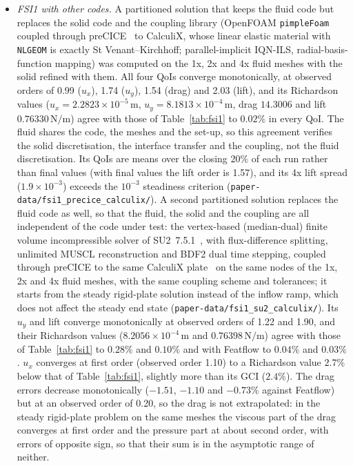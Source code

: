 \begin{itemize}
	\item \emph{FSI1 with other codes.} A partitioned solution that keeps the fluid code but replaces the solid code and the coupling library (OpenFOAM \texttt{pimpleFoam} coupled through preCICE~\citep{Chourdakis2022} to CalculiX, whose linear elastic material with \texttt{NLGEOM} is exactly St Venant--Kirchhoff; parallel-implicit IQN-ILS, radial-basis-function mapping) was computed on the 1x, 2x and 4x fluid meshes with the solid refined with them. All four QoIs converge monotonically, at observed orders of 0.99 ($u_x$), 1.74 ($u_y$), 1.54 (drag) and 2.03 (lift), and its Richardson values ($u_x = 2.2823\times10^{-5}\,\mathrm{m}$, $u_y = 8.1813\times10^{-4}\,\mathrm{m}$, drag $14.3006$ and lift $0.76330\,\mathrm{N/m}$) agree with those of Table~\ref{tab:fsi1} to $0.02\%$ in every QoI. The fluid shares the code, the meshes and the set-up, so this agreement verifies the solid discretisation, the interface transfer and the coupling, not the fluid discretisation. Its QoIs are means over the closing $20\%$ of each run rather than final values (with final values the lift order is 1.57), and its 4x lift spread ($1.9\times10^{-3}$) exceeds the $10^{-3}$ steadiness criterion (\texttt{paper-data/fsi1\_precice\_calculix/}).
	A second partitioned solution replaces the fluid code as well, so that the fluid, the solid and the coupling are all independent of the code under test: the vertex-based (median-dual) finite volume incompressible solver of SU2~7.5.1~\citep{Economon2016,Economon2020}, with flux-difference splitting, unlimited MUSCL reconstruction and BDF2 dual time stepping, coupled through preCICE to the same CalculiX plate~\citep{Dhondt2004} on the same nodes of the 1x, 2x and 4x fluid meshes, with the same coupling scheme and tolerances; it starts from the steady rigid-plate solution instead of the inflow ramp, which does not affect the steady end state (\texttt{paper-data/fsi1\_su2\_calculix/}).
	Its $u_y$ and lift converge monotonically at observed orders of 1.22 and 1.90, and their Richardson values ($8.2056\times10^{-4}\,\mathrm{m}$ and $0.76398\,\mathrm{N/m}$) agree with those of Table~\ref{tab:fsi1} to $0.28\%$ and $0.10\%$ and with Featflow to $0.04\%$ and $0.03\%$.
	$u_x$ converges at first order (observed order 1.10) to a Richardson value $2.7\%$ below that of Table~\ref{tab:fsi1}, slightly more than its GCI ($2.4\%$).
	The drag errors decrease monotonically ($-1.51$, $-1.10$ and $-0.73\%$ against Featflow) but at an observed order of 0.20, so the drag is not extrapolated: in the steady rigid-plate problem on the same meshes the viscous part of the drag converges at first order and the pressure part at about second order, with errors of opposite sign, so that their sum is in the asymptotic range of neither.

\end{itemize}
